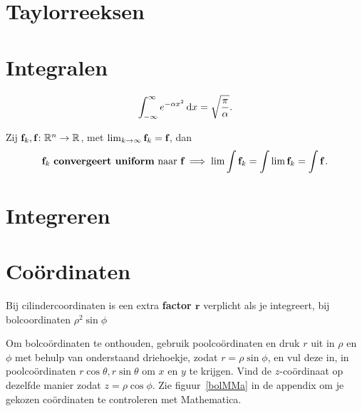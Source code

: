 \documentclass{article}
\begin{document}
    \section{Taylorreeksen}\label{sec:taylorreeksen}
    

    \section{Integralen}\label{sec:integralen}

    \begin{stelling}
        \[ \int_{-\infty}^\infty e^{-\alpha x^2} \mathop{}\!\mathrm{d} x = \sqrt {\frac \pi \alpha}.\]
    \end{stelling}

    \begin{stelling}
        Zij ${\textbf{f}}_k,{\textbf{f}} \colon \mathbb{R}^n \to \mathbb{R}$, met $\lim_{k \to \infty} {\textbf{f}}_k = {\textbf{f}}$, dan
        \[ {\textbf{f}}_k \text { \textbf{convergeert uniform} naar } {\textbf{f}} \implies \lim \int {\textbf{f}}_k = \int \lim {\textbf{f}}_k = \int {\textbf{f}} \,. \]
    \end{stelling}

    \section{Integreren}\label{sec:integreren}
    

    \section{Co\"ordinaten}\label{sec:coordinaten}
    Bij cilindercoordinaten is een extra \textbf{factor $\bm r$} verplicht als je integreert, bij bolcoordinaten $\rho^2 \sin \phi$

    Om bolco\"ordinaten te onthouden, gebruik poolco\"ordinaten en druk $r$ uit in $\rho$ en $\phi$ met behulp van onderstaand driehoekje, zodat $r=\rho \sin \phi$, en vul deze in, in poolco\"ordinaten $r \cos \theta,r \sin \theta$ om $x$ en $y$ te krijgen.
    Vind de $z$-co\"ordinaat op dezelfde manier zodat $z=\rho \cos \phi$.
    Zie figuur~\ref{bolMMa} in de appendix om je gekozen co\"ordinaten te controleren met Mathematica.

\end{document}
